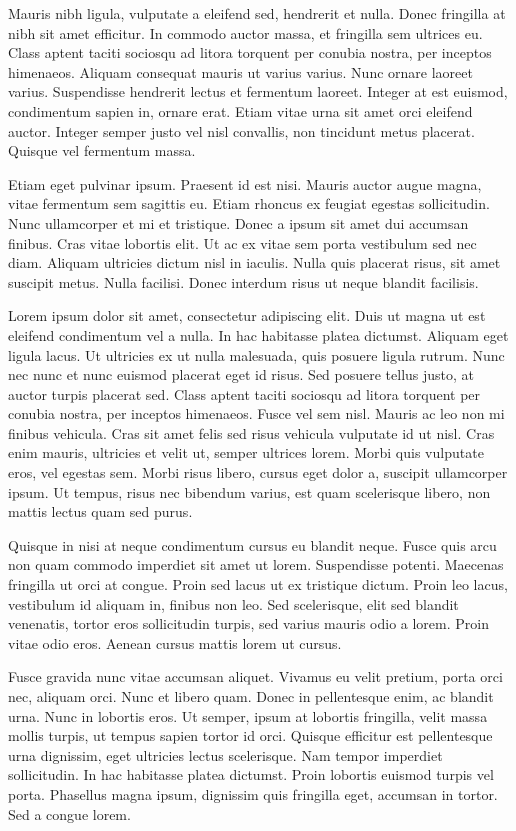 \documentclass{report}
\begin{document}
Mauris nibh ligula, vulputate a eleifend sed, hendrerit et nulla. Donec fringilla at nibh sit amet efficitur. In commodo auctor massa, et fringilla sem ultrices eu. Class aptent taciti sociosqu ad litora torquent per conubia nostra, per inceptos himenaeos. Aliquam consequat mauris ut varius varius. Nunc ornare laoreet varius. Suspendisse hendrerit lectus et fermentum laoreet. Integer at est euismod, condimentum sapien in, ornare erat. Etiam vitae urna sit amet orci eleifend auctor. Integer semper justo vel nisl convallis, non tincidunt metus placerat. Quisque vel fermentum massa.

Etiam eget pulvinar ipsum. Praesent id est nisi. Mauris auctor augue magna, vitae fermentum sem sagittis eu. Etiam rhoncus ex feugiat egestas sollicitudin. Nunc ullamcorper et mi et tristique. Donec a ipsum sit amet dui accumsan finibus. Cras vitae lobortis elit. Ut ac ex vitae sem porta vestibulum sed nec diam. Aliquam ultricies dictum nisl in iaculis. Nulla quis placerat risus, sit amet suscipit metus. Nulla facilisi. Donec interdum risus ut neque blandit facilisis.

\setlength{\columnseprule}{0.1cm}
\begin{multicols}{3}
Lorem ipsum dolor sit amet, consectetur adipiscing elit. Duis ut magna ut est eleifend condimentum vel a nulla. In hac habitasse platea dictumst. Aliquam eget ligula lacus. Ut ultricies ex ut nulla malesuada, quis posuere ligula rutrum. Nunc nec nunc et nunc euismod placerat eget id risus. Sed posuere tellus justo, at auctor turpis placerat sed. Class aptent taciti sociosqu ad litora torquent per conubia nostra, per inceptos himenaeos. Fusce vel sem nisl. Mauris ac leo non mi finibus vehicula. Cras sit amet felis sed risus vehicula vulputate id ut nisl. Cras enim mauris, ultricies et velit ut, semper ultrices lorem. Morbi quis vulputate eros, vel egestas sem. Morbi risus libero, cursus eget dolor a, suscipit ullamcorper ipsum. Ut tempus, risus nec bibendum varius, est quam scelerisque libero, non mattis lectus quam sed purus.

Quisque in nisi at neque condimentum cursus eu blandit neque. Fusce quis arcu non quam commodo imperdiet sit amet ut lorem. Suspendisse potenti. Maecenas fringilla ut orci at congue. Proin sed lacus ut ex tristique dictum. Proin leo lacus, vestibulum id aliquam in, finibus non leo. Sed scelerisque, elit sed blandit venenatis, tortor eros sollicitudin turpis, sed varius mauris odio a lorem. Proin vitae odio eros. Aenean cursus mattis lorem ut cursus.

Fusce gravida nunc vitae accumsan aliquet. Vivamus eu velit pretium, porta orci nec, aliquam orci. Nunc et libero quam. Donec in pellentesque enim, ac blandit urna. Nunc in lobortis eros. Ut semper, ipsum at lobortis fringilla, velit massa mollis turpis, ut tempus sapien tortor id orci. Quisque efficitur est pellentesque urna dignissim, eget ultricies lectus scelerisque. Nam tempor imperdiet sollicitudin. In hac habitasse platea dictumst. Proin lobortis euismod turpis vel porta. Phasellus magna ipsum, dignissim quis fringilla eget, accumsan in tortor. Sed a congue lorem.
\end{multicols}
\end{document}
